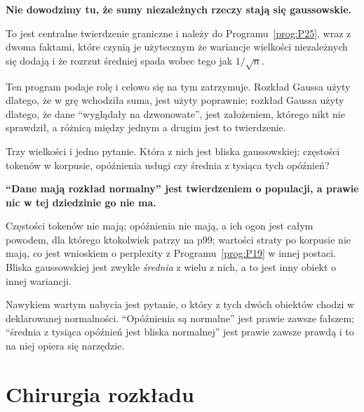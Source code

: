\begin{fr}
\begin{rigourbox}
\textbf{Nie dowodzimy tu, że sumy niezależnych rzeczy stają się gaussowskie.}

To jest centralne twierdzenie graniczne i należy do
Programu~\ref{prog:P25}, wraz z dwoma faktami, które czynią je użytecznym
\dash{} że wariancje wielkości niezależnych się dodają i że rozrzut średniej
spada wobec tego jak $1/\sqrt{n}$.

Ten program podaje rolę i celowo się na tym zatrzymuje. Rozkład Gaussa użyty
dlatego, że w grę wchodziła suma, jest użyty poprawnie; rozkład Gaussa użyty
dlatego, że dane \enquote{wyglądały na dzwonowate}, jest założeniem, którego
nikt nie sprawdził, a różnicą między jednym a drugim jest to twierdzenie.
\end{rigourbox}
\end{fr}

\begin{fr}
Trzy wielkości i jedno pytanie. Która z nich jest bliska gaussowskiej:
częstości tokenów w korpusie, opóźnienia usługi czy średnia z tysiąca tych
opóźnień?
\dotline
\nextframe
\end{fr}

\begin{fr}

\begin{trapbox}
\textbf{\enquote{Dane mają rozkład normalny} jest twierdzeniem o populacji, a
prawie nic w tej dziedzinie go nie ma.}

Częstości tokenów nie mają; opóźnienia nie mają, a ich ogon jest całym
powodem, dla którego ktokolwiek patrzy na p99; wartości straty po korpusie nie
mają, co jest wnioskiem o perplexity z Programu~\ref{prog:P19} w innej
postaci. Bliska gaussowskiej jest zwykle \emph{średnia} z wielu z nich, a to
jest inny obiekt o innej wariancji.

Nawykiem wartym nabycia jest pytanie, o który z tych dwóch obiektów chodzi w
deklarowanej normalności. \enquote{Opóźnienia są normalne} jest prawie zawsze
fałszem; \enquote{średnia z tysiąca opóźnień jest bliska normalnej} jest
prawie zawsze prawdą i to na niej opiera się narzędzie.
\end{trapbox}
\end{fr}

\section{Chirurgia rozkładu}
\label{sec:P24-surgery}

